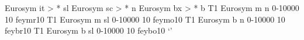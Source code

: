 \fontmapshape Eurosym it > * sl
\fontmapshape Eurosym sc > * n
\fontmapseries Eurosym bx > * b
\declarefont T1 Eurosym m   n   0-10000  10 feymr10
\declarefont T1 Eurosym m   sl  0-10000  10 feymo10
\declarefont T1 Eurosym b   n   0-10000  10 feybr10
\declarefont T1 Eurosym b   sl  0-10000  10 feybo10
%
%
\def\cm@digits{%
  \mathcode`0"7030
  \mathcode`1"7031
  \mathcode`2"7032
  \mathcode`3"7033
  \mathcode`4"7034
  \mathcode`5"7035
  \mathcode`6"7036
  \mathcode`7"7037
  \mathcode`8"7038
  \mathcode`9"7039
}%
%
\def\cm@upper@greek{%
  \let\Gamma\@cm@Gamma
  \let\Delta\@cm@Delta
  \let\Theta\@cm@Theta
  \let\Lambda\@cm@Lambda
  \let\Xi\@cm@Xi
  \let\Pi\@cm@Pi
  \let\Sigma\@cm@Sigma
  \let\Upsilon\@cm@Upsilon
  \let\Phi\@cm@Phi
  \let\Psi\@cm@Psi
  \let\Omega\@cm@Omega
}%
\let\@cm@Gamma\Gamma
\let\@cm@Delta\Delta
\let\@cm@Theta\Theta
\let\@cm@Lambda\Lambda
\let\@cm@Xi\Xi
\let\@cm@Pi\Pi
\let\@cm@Sigma\Sigma
\let\@cm@Upsilon\Upsilon
\let\@cm@Phi\Phi
\let\@cm@Psi\Psi
\let\@cm@Omega\Omega
\let\@cm@varsigma\varsigma
\let\@cm@varrho\varrho
%
\def\cm@lower@greek{%
  \let\varsigma\@cm@varsigma
  \let\varrho\@cm@varrho
}%
\let\@cm@varsigma\varsigma
\let\@cm@varrho\varrho
%
\def\cm@ordinary{%
  \mathcode`!"5021 %
  \let\infty\@cm@infty
  \let\Re\@cm@Re
  \let\Im\@cm@Im
}%
\let\@cm@infty\infty
\let\@cm@Re\Re
\let\@cm@Im\Im
%
\def\cm@binary{%
  \mathcode`+="202B
  \let\triangleleft\@cm@triangleleft
  \let\triangleright\@cm@triangleright
}%
\let\@cm@triangleleft\triangleleft
\let\@cm@triangleright\triangleright
%
\def\cm@relations{%
  \mathcode`:"303A
  \mathcode`="303D
  \let\relbar\@cm@relbar
  \let\Relbar\@cm@Relbar
}%
\let\@cm@relbar\relbar
\let\@cm@Relbar\Relbar
%
\def\cm@delims{%
  \mathcode`("4028 \delcode`("028300
  \mathcode`)"5029 \delcode`)"029301
  \mathcode`["405B \delcode`["05B302
  \mathcode`]"505D \delcode`]"05D303
  \delcode`/"02F30E
}%
%
\def\cm@vec{\let\vec\@cm@vec}%
\let\@cm@vec\vec
%
{\catcode`'\active
\gdef\cm@prime{\let'\@cm@prime}%
\global\let\@cm@prime'%
\gdef\def@active@prime{\def'}%
}%
%
\def\cm@fillarrows{%
  \let\rightarrowfill\@cm@rightarrowfill
  \let\leftarrowfill\@cm@leftarrowfill
}%
\let\@cm@rightarrowfill\rightarrowfill
